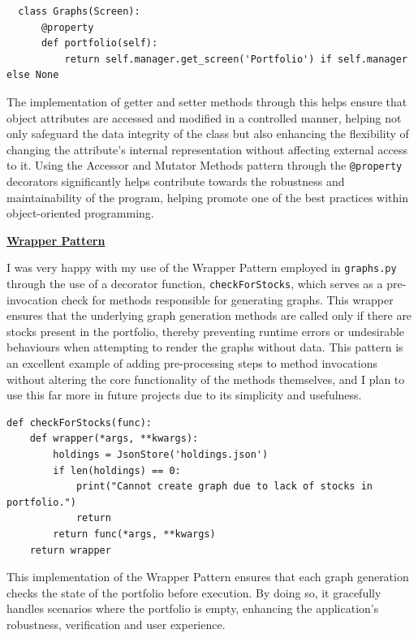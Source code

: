 \documentclass{article}
\begin{document}
\begin{verbatim}
  class Graphs(Screen):
      @property
      def portfolio(self):
          return self.manager.get_screen('Portfolio') if self.manager else None
\end{verbatim}

\vspace{0.3cm}
The implementation of getter and setter methods through this helps ensure that object attributes are accessed and modified in a controlled manner, helping not only safeguard the data integrity of the class but also enhancing the flexibility of changing the attribute's internal representation without affecting external access to it. Using the Accessor and Mutator Methods pattern through the \texttt{@property} decorators significantly helps contribute towards the robustness and maintainability of the program, helping promote one of the best practices within object-oriented programming.\\\vspace{0.3cm}


\underline{\textbf{Wrapper Pattern}}\\\vspace{0.3cm}

I was very happy with my use of the Wrapper Pattern employed in \texttt{graphs.py} through the use of a decorator function, \texttt{checkForStocks}, which serves as a pre-invocation check for methods responsible for generating graphs. This wrapper ensures that the underlying graph generation methods are called only if there are stocks present in the portfolio, thereby preventing runtime errors or undesirable behaviours when attempting to render the graphs without data. This pattern is an excellent example of adding pre-processing steps to method invocations without altering the core functionality of the methods themselves, and I plan to use this far more in future projects due to its simplicity and usefulness.\\\vspace{0.3cm}

\begin{verbatim}
def checkForStocks(func):
    def wrapper(*args, **kwargs):
        holdings = JsonStore('holdings.json')
        if len(holdings) == 0:
            print("Cannot create graph due to lack of stocks in portfolio.")
            return
        return func(*args, **kwargs)
    return wrapper
\end{verbatim}

\vspace{0.3cm}
This implementation of the Wrapper Pattern ensures that each graph generation checks the state of the portfolio before execution. By doing so, it gracefully handles scenarios where the portfolio is empty, enhancing the application's robustness, verification and user experience.\\\vspace{0.3cm}
\end{document}
